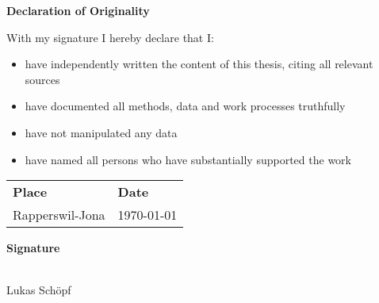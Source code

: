 %
%
%
\pagestyle{plain}
\vspace{0.8cm}
\noindent
\textbf{\Huge Declaration of Originality}
\vspace{1cm}

\noindent
With my signature I hereby declare that I:
\begin{itemize}
    \item have independently written the content of this thesis, citing all relevant sources
    \item have documented all methods, data and work processes truthfully
    \item have not manipulated any data
    \item have named all persons who have substantially supported the work
\end{itemize}



\noindent
\begin{tabular}{@{}l@{} l}    
    \textbf{Place} & \textbf{Date} \\
    Rapperswil-Jona \hspace{0.5cm}  & \today
\end{tabular}
\vspace{2.5cm}

\noindent
\textbf{Signature} 
\vspace{0.5cm}

\noindent
\makebox[5cm]{\hrulefill} \hspace{2cm}\\
\vspace{1.0cm}
Lukas Schöpf

\clearpage